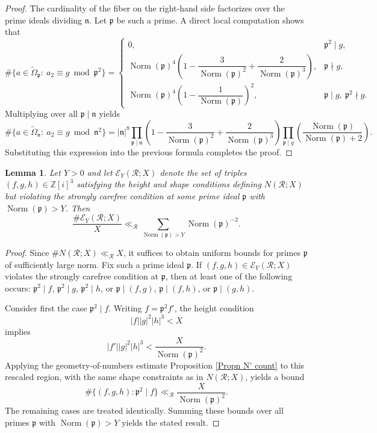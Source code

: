 \documentclass{amsart}
\newcommand{\op}[1]{\operatorname{#1}}
\newcommand{\Z}{\mathbb{Z}}
\theoremstyle{plain}
\newtheorem{lemma}[theorem]{Lemma}
\theoremstyle{definition}
\theoremstyle{remark}
\numberwithin{equation}{section}
\begin{document}
\begin{proof}
The cardinality of the fiber on the right-hand side factorizes over the
prime ideals dividing\/ $\mathfrak n$. Let $\mathfrak p$ be such a prime.
A direct local computation shows that
\[
\#\{a\in\widetilde{\Omega}_{\mathfrak p}:\ a_2\equiv g \bmod \mathfrak p^2\}
=
\begin{cases}
0, & \mathfrak p^2\mid g,\\[4pt]
\op{Norm}(\mathfrak p)^4
\left(1-\dfrac{3}{\op{Norm}(\mathfrak p)^2}+\dfrac{2}{\op{Norm}(\mathfrak p)^3}\right),
& \mathfrak p\nmid g,\\[8pt]
\op{Norm}(\mathfrak p)^4
\left(1-\dfrac{1}{\op{Norm}(\mathfrak p)}\right)^2,
& \mathfrak p\mid g,\ \mathfrak p^2\nmid g.
\end{cases}
\]
Multiplying over all $\mathfrak p\mid\mathfrak n$ yields
\[
\#\{a\in\widetilde{\Omega}_{\mathfrak n}:\ a_2\equiv g \bmod \mathfrak n^2\}
=
|\mathfrak{n}|^8
\prod_{\mathfrak p\mid\mathfrak n}
\left(1-\dfrac{3}{\op{Norm}(\mathfrak p)^2}+\dfrac{2}{\op{Norm}(\mathfrak p)^3}\right)
\prod_{\mathfrak p\mid g}
\left(
\frac{\op{Norm}(\mathfrak p)}
{\op{Norm}(\mathfrak p)+2}
\right).
\]
Substituting this expression into the previous formula completes the
proof.
\end{proof}




\begin{lemma}\label{lem:large-prime-tail}
Let $Y>0$ and let $\mathcal E_Y(\mathcal R;X)$ denote the set of triples
$(f,g,h)\in\Z[i]^3$ satisfying the height and shape conditions defining
$N(\mathcal R;X)$ but violating the strongly carefree condition at some
prime ideal $\mathfrak p$ with $\op{Norm}(\mathfrak p)>Y$. Then
\[
\frac{\#\mathcal E_Y(\mathcal R;X)}{X}
\ll_{\mathcal R}
\sum_{\op{Norm}(\mathfrak p)>Y}\op{Norm}(\mathfrak p)^{-2}.
\]
\end{lemma}

\begin{proof}
Since $\#N(\mathcal R;X)\ll_{\mathcal R} X$, it suffices to obtain
uniform bounds for primes $\mathfrak p$ of sufficiently large norm.
Fix such a prime ideal $\mathfrak p$. If $(f,g,h)\in\mathcal
E_Y(\mathcal R;X)$ violates the strongly carefree condition at
$\mathfrak p$, then at least one of the following occurs: $\mathfrak
p^2\mid f$, $\mathfrak p^2\mid g$, $\mathfrak p^2\mid h$, or $\mathfrak
p\mid(f,g)$, $\mathfrak p\mid(f,h)$, or $\mathfrak p\mid(g,h)$.

Consider first the case $\mathfrak p^2\mid f$. Writing $f=\mathfrak
p^2f'$, the height condition
\[
|f||g|^2|h|^3<X
\]
implies
\[
|f'||g|^2|h|^3<\frac{X}{\op{Norm}(\mathfrak p)^2}.
\]
Applying the geometry-of-numbers estimate Proposition \ref{Propn N' count} to this
rescaled region, with the same shape constraints as in $N(\mathcal
R;X)$, yields a bound
\[
\#\{(f,g,h):\mathfrak p^2\mid f\}
\ll_{\mathcal R}
\frac{X}{\op{Norm}(\mathfrak p)^{2}}.
\]
The remaining cases are
treated identically. Summing these bounds over all primes
$\mathfrak p$ with $\op{Norm}(\mathfrak p)>Y$ yields the stated result.
\end{proof}
\end{document}

